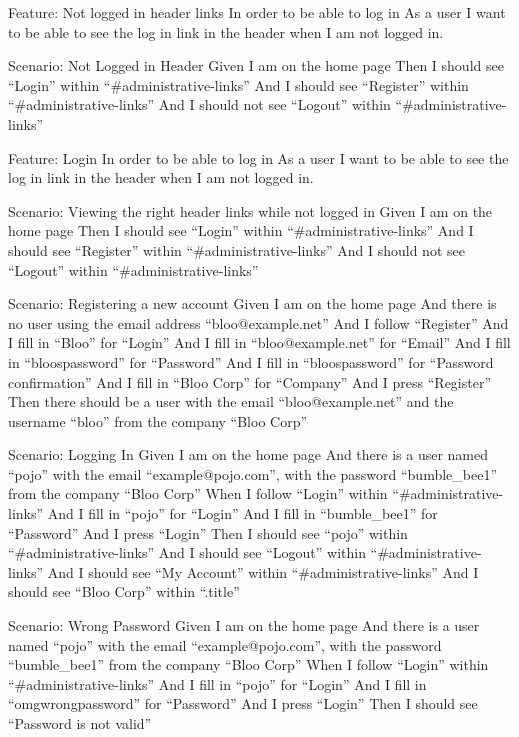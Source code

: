 \documentclass[12pt]{article}
\begin{document}
\begin{hangparas}{0.25in}{1}
Feature: Not logged in header links 
In order to be able to log in 
As a user 
I want to be able to see the log in link in the header when I am not logged in. 

Scenario: Not Logged in Header  
Given I am on the home page 
Then I should see ``Login'' within ``\#administrative-links'' 
And I should see ``Register'' within ``\#administrative-links'' 
And I should not see ``Logout'' within ``\#administrative-links'' 

Feature: Login 
  In order to be able to log in 
  As a user 
  I want to be able to see the log in link in the header when I am not logged in. 

Scenario: Viewing the right header links while not logged in  
  Given I am on the home page 
  Then I should see ``Login'' within ``\#administrative-links'' 
  And I should see ``Register'' within ``\#administrative-links'' 
  And I should not see ``Logout'' within ``\#administrative-links'' 


Scenario: Registering a new account 
Given I am on the home page 
And there is no user using the email address ``bloo@example.net'' 
And I follow ``Register'' 
And I fill in ``Bloo'' for ``Login'' 
And I fill in ``bloo@example.net'' for ``Email'' 
And I fill in ``bloospassword'' for ``Password'' 
And I fill in ``bloospassword'' for ``Password confirmation'' 
And I fill in ``Bloo Corp'' for ``Company'' 
And I press ``Register'' 
Then there should be a user with the email ``bloo@example.net'' and the username ``bloo'' from the company ``Bloo Corp'' 

Scenario: Logging In 
Given I am on the home page 
And there is a user named ``pojo'' with the email ``example@pojo.com'', with the password ``bumble\_bee1'' from the company ``Bloo Corp'' 
When I follow ``Login'' within ``\#administrative-links'' 
And I fill in ``pojo'' for ``Login'' 
And I fill in ``bumble\_bee1'' for ``Password'' 
And I press ``Login'' 
Then I should see ``pojo'' within ``\#administrative-links'' 
And I should see ``Logout'' within ``\#administrative-links'' 
And I should see ``My Account'' within ``\#administrative-links'' 
And I should see ``Bloo Corp'' within ``.title'' 

Scenario: Wrong Password 
  Given I am on the home page 
  And there is a user named ``pojo'' with the email ``example@pojo.com'', with the password ``bumble\_bee1'' from the company ``Bloo Corp'' 
  When I follow ``Login'' within ``\#administrative-links'' 
  And I fill in ``pojo'' for ``Login'' 
  And I fill in ``omgwrongpassword'' for ``Password'' 
  And I press ``Login'' 
  Then I should see ``Password is not valid'' 


\end{hangparas}
\end{document}
